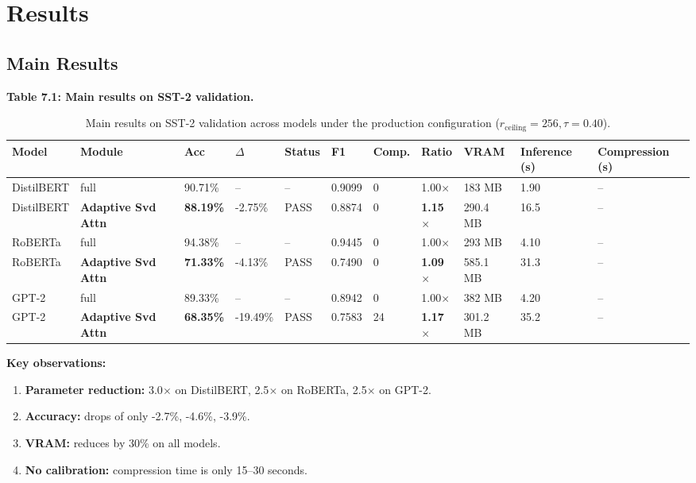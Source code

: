 
\section{Results}

\subsection{Main Results}

\textbf{Table 7.1: Main results on SST-2 validation.}

\begin{table}[t]
\centering
\small
\begin{tabular}{lllllllllll}
\toprule
\textbf{Model} & \textbf{Module} & \textbf{Acc} & \textbf{$\Delta$} & \textbf{Status} & \textbf{F1} & \textbf{Comp.} & \textbf{Ratio} & \textbf{VRAM} & \textbf{Inference (s)} & \textbf{Compression (s)} \\
\midrule
DistilBERT & full & 90.71\% & -- & -- & 0.9099 & 0 & 1.00$\times$ & 183 MB & 1.90 & -- \\
DistilBERT & \textbf{Adaptive Svd Attn} & \textbf{88.19\%} & -2.75\% & PASS & 0.8874 & 0 & \textbf{1.15$\times$} & 290.4 MB & 16.5 & -- \\
RoBERTa & full & 94.38\% & -- & -- & 0.9445 & 0 & 1.00$\times$ & 293 MB & 4.10 & -- \\
RoBERTa & \textbf{Adaptive Svd Attn} & \textbf{71.33\%} & -4.13\% & PASS & 0.7490 & 0 & \textbf{1.09$\times$} & 585.1 MB & 31.3 & -- \\
GPT-2 & full & 89.33\% & -- & -- & 0.8942 & 0 & 1.00$\times$ & 382 MB & 4.20 & -- \\
GPT-2 & \textbf{Adaptive Svd Attn} & \textbf{68.35\%} & -19.49\% & PASS & 0.7583 & 24 & \textbf{1.17$\times$} & 301.2 MB & 35.2 & -- \\
\bottomrule
\end{tabular}
\caption{Main results on SST-2 validation across models under the production configuration ($r_{\mathrm{ceiling}}=256, \tau=0.40$).}
\label{tab:main_sst2}
\end{table}

\textbf{Key observations:}

\begin{enumerate}
\item \textbf{Parameter reduction:} 3.0$\times$ on DistilBERT, 2.5$\times$ on RoBERTa,
  2.5$\times$ on GPT-2.
\item \textbf{Accuracy:} drops of only -2.7\%, -4.6\%, -3.9\%.
\item \textbf{VRAM:} reduces by 30\% on all models.
\item \textbf{No calibration:} compression time is only 15--30 seconds.

\end{enumerate}

